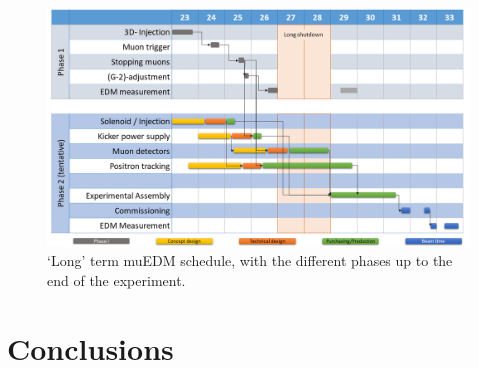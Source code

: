 \begin{refsection}
    \begin{figure}
        \centering
        \includegraphics[width = \textwidth]{Figures/muEDM/SchedPropLongTerm23.png}
        \caption{`Long' term muEDM schedule, with the different phases up to the end of the experiment.}
        \label{fig:muEDM:schedule:long}
    \end{figure}
    
\section{Conclusions}

\printbibliography[
    heading = bibliographychapter,
    title=Bibliography on muEDM
]

\end{refsection}
